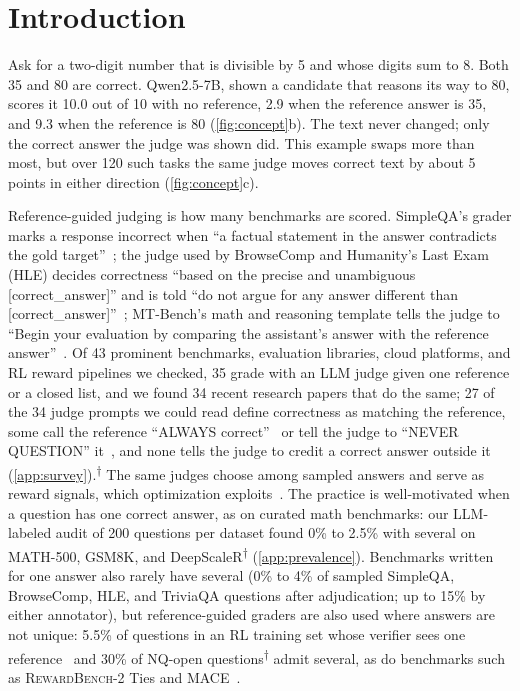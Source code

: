 \documentclass{article}
\newcommand{\ph}{\textsuperscript{$\dagger$}}
\begin{document}
\section{Introduction}
\label{sec:intro}

Ask for a two-digit number that is divisible by 5 and whose digits sum to 8.
Both 35 and 80 are correct.
Qwen2.5-7B, shown a candidate that reasons its way to 80, scores it 10.0 out of 10 with no reference, 2.9 when the reference answer is 35, and 9.3 when the reference is 80 (\cref{fig:concept}b).
The text never changed; only the correct answer the judge was shown did.
This example swaps more than most, but over 120 such tasks the same judge moves correct text by about 5 points in either direction (\cref{fig:concept}c).

Reference-guided judging is how many benchmarks are scored.
SimpleQA's grader marks a response incorrect when ``a factual statement in the answer contradicts the gold target''~\citep{wei2024simpleqa}; the judge used by BrowseComp and Humanity's Last Exam (HLE) decides correctness ``based on the precise and unambiguous [correct\_answer]'' and is told ``do not argue for any answer different than [correct\_answer]''~\citep{wei2025browsecomp,phan2025hle}; MT-Bench's math and reasoning template tells the judge to ``Begin your evaluation by comparing the assistant's answer with the reference answer''~\citep{zheng2023judging}.
Of 43 prominent benchmarks, evaluation libraries, cloud platforms, and RL reward pipelines we checked, 35 grade with an LLM judge given one reference or a closed list, and we found 34 recent research papers that do the same; 27 of the 34 judge prompts we could read define correctness as matching the reference, some call the reference ``ALWAYS correct''~\citep{gao2024omnimath} or tell the judge to ``NEVER QUESTION'' it~\citep{liu2025compassverifier}, and none tells the judge to credit a correct answer outside it (\cref{app:survey}).\ph
The same judges choose among sampled answers and serve as reward signals, which optimization exploits~\citep{gao2022scaling}.
The practice is well-motivated when a question has one correct answer, as on curated math benchmarks: our LLM-labeled audit of 200 questions per dataset found 0\% to 2.5\% with several on MATH-500, GSM8K, and DeepScaleR\ph{} (\cref{app:prevalence}).
Benchmarks written for one answer also rarely have several (0\% to 4\% of sampled SimpleQA, BrowseComp, HLE, and TriviaQA questions after adjudication; up to 15\% by either annotator), but reference-guided graders are also used where answers are not unique: 5.5\% of questions in an RL training set whose verifier sees one reference~\citep{ma2025generalreasoner} and 30\% of NQ-open questions\ph{} admit several, as do benchmarks such as \textsc{RewardBench-2} Ties and \textsc{MACE}~\citep{malik2025rewardbench2,mace2026}.
\end{document}
